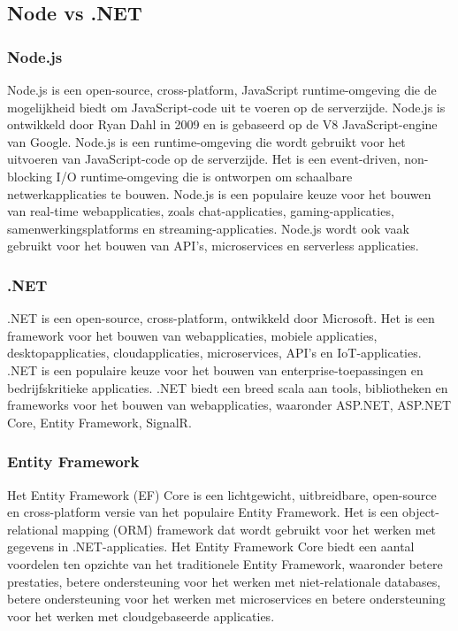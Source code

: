 \subsection*{Node vs .NET}%
\subsubsection*{Node.js}%
Node.js is een open-source, cross-platform, JavaScript runtime-omgeving die de
mogelijkheid biedt om JavaScript-code uit te voeren op de serverzijde. Node.js
is ontwikkeld door Ryan Dahl in 2009 en is gebaseerd op de V8 JavaScript-engine
van Google. Node.js is een runtime-omgeving die wordt gebruikt voor het
uitvoeren van JavaScript-code op de serverzijde. Het is een event-driven,
non-blocking I/O runtime-omgeving die is ontworpen om schaalbare
netwerkapplicaties te bouwen. Node.js is een populaire keuze voor het bouwen
van real-time webapplicaties, zoals chat-applicaties, gaming-applicaties,
samenwerkingsplatforms en streaming-applicaties. Node.js wordt ook vaak
gebruikt voor het bouwen van API's, microservices en serverless applicaties.
\autocite{Nodejs2023}

\subsubsection*{.NET}%
.NET is een open-source, cross-platform, ontwikkeld door Microsoft. Het is een framework voor het bouwen van webapplicaties, mobiele applicaties, desktopapplicaties, cloudapplicaties, microservices, API's en IoT-applicaties. .NET is een populaire keuze voor het bouwen van enterprise-toepassingen en bedrijfskritieke applicaties. .NET biedt een breed scala aan tools, bibliotheken en frameworks voor het bouwen van webapplicaties, waaronder ASP.NET, ASP.NET Core,  Entity Framework, SignalR.\autocite{Microsoft2024}

\subsubsection*{Entity Framework}%
Het Entity Framework (EF) Core is een lichtgewicht, uitbreidbare, open-source en cross-platform versie van het populaire Entity Framework. Het is een object-relational mapping (ORM) framework dat wordt gebruikt voor het werken met gegevens in .NET-applicaties. Het Entity Framework Core biedt een aantal voordelen ten opzichte van het traditionele Entity Framework, waaronder betere prestaties, betere ondersteuning voor het werken met niet-relationale databases, betere ondersteuning voor het werken met microservices en betere ondersteuning voor het werken met cloudgebaseerde applicaties.\autocite{Microsoft2024}

